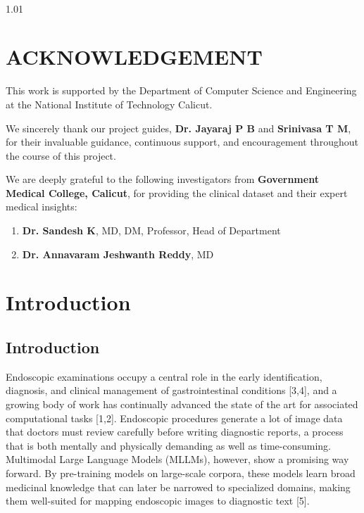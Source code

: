 ﻿﻿\documentclass[12pt]{report}
\begin{document}
\begin{spacing}{1.01}
\chapter*{\rm \large \bf ACKNOWLEDGEMENT}
\vspace{4.0mm}
This work is supported by the Department of Computer Science and Engineering at the National Institute of Technology Calicut.

We sincerely thank our project guides, \textbf{Dr. Jayaraj P B} and \textbf{Srinivasa T M}, for their invaluable guidance, continuous support, and encouragement throughout the course of this project.

We are deeply grateful to the following investigators from \textbf{Government Medical College, Calicut}, for providing the clinical dataset and their expert medical insights:
\begin{enumerate}
    \item \textbf{Dr. Sandesh K}, MD, DM, Professor, Head of Department
    \item \textbf{Dr. Annavaram Jeshwanth Reddy}, MD
\end{enumerate}
\tableofcontents
{}
\end{spacing}
\listoffigures
\listoftables
\vspace{-2 em}
\printglossary[nonumberlist]



\chapter{Introduction}

\section{Introduction}
Endoscopic examinations occupy a central role in the early identification, diagnosis, and clinical management of gastrointestinal conditions [3,4], and a growing body of work has continually advanced the state of the art for associated computational tasks [1,2]. Endoscopic procedures generate a lot of image data that doctors must review carefully before writing diagnostic reports, a process that is both mentally and physically demanding as well as time-consuming. Multimodal Large Language Models (MLLMs), however, show a promising way forward. By pre-training models on large-scale corpora, these models learn broad medicinal knowledge that can later be narrowed to specialized domains, making them well-suited for mapping endoscopic images to diagnostic text [5].
\end{document}
